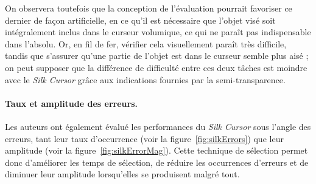 	On observera toutefois que la conception de l'évaluation pourrait favoriser ce dernier de façon artificielle, en ce qu'il est nécessaire que l'objet visé soit intégralement inclus dans le curseur volumique, ce qui ne paraît pas indispensable dans l'absolu. Or, en fil de fer, vérifier cela visuellement paraît très difficile, tandis que s'assurer qu'une partie de l'objet est dans le curseur semble plus aisé ; on peut supposer que la différence de difficulté entre ces deux tâches est moindre avec le \emph{Silk Cursor} grâce aux indications fournies par la semi-transparence.
	
	\paragraph{Taux et amplitude des erreurs.}
	Les auteurs ont également évalué les performances du \emph{Silk Cursor} sous l'angle des erreurs, tant leur taux d'occurrence (voir la figure~\ref{fig:silkErrors}) que leur amplitude (voir la figure~\ref{fig:silkErrorMag}). Cette technique de sélection permet donc d'améliorer les temps de sélection, de réduire les occurrences d'erreurs et de diminuer leur amplitude lorsqu'elles se produisent malgré tout.
	
